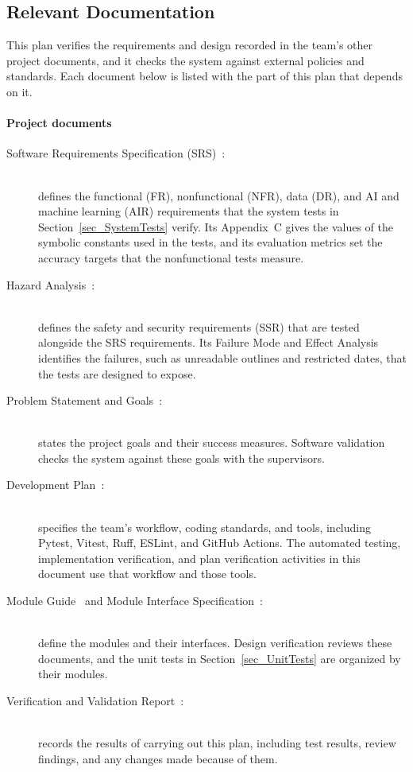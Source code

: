 \documentclass[12pt, titlepage]{article}
\begin{document}
\subsection{Relevant Documentation} \label{sec:RelevantDocs}

This plan verifies the requirements and design recorded in the team's other
project documents, and it checks the system against external policies and
standards. Each document below is listed with the part of this plan that
depends on it.

\paragraph{Project documents}
\begin{description}
  \item[Software Requirements Specification (SRS)~\citep{TeamBVSH2026SRS}:]\mbox{}\\
  defines the functional (FR), nonfunctional (NFR), data (DR), and AI and
  machine learning (AIR) requirements that the system tests in
  Section~\ref{sec_SystemTests} verify. Its Appendix~C gives the values of the
  symbolic constants used in the tests, and its evaluation metrics set the
  accuracy targets that the nonfunctional tests measure.
  \item[Hazard Analysis~\citep{TeamBVSH2026HA}:]\mbox{}\\
  defines the safety and
  security requirements (SSR) that are tested alongside the SRS requirements.
  Its Failure Mode and Effect Analysis identifies the failures, such as
  unreadable outlines and restricted dates, that the tests are designed to
  expose.
  \item[Problem Statement and Goals~\citep{TeamBVSH2026PS}:]\mbox{}\\
  states the
  project goals and their success measures. Software validation checks the
  system against these goals with the supervisors.
  \item[Development Plan~\citep{TeamBVSH2026DP}:]\mbox{}\\
  specifies the team's
  workflow, coding standards, and tools, including Pytest, Vitest, Ruff,
  ESLint, and GitHub Actions. The automated testing, implementation
  verification, and plan verification activities in this document use that
  workflow and those tools.
  \item[Module Guide~\citep{TeamBVSH2026MG} and Module Interface
  Specification~\citep{TeamBVSH2026MIS}:]\mbox{}\\
  define the modules and their
  interfaces. Design verification reviews these documents, and the unit tests
  in Section~\ref{sec_UnitTests} are organized by their modules.
  \item[Verification and Validation Report~\citep{TeamBVSH2026VnVR}:]\mbox{}\\
  records
  the results of carrying out this plan, including test results, review
  findings, and any changes made because of them.
\end{description}
\end{document}
